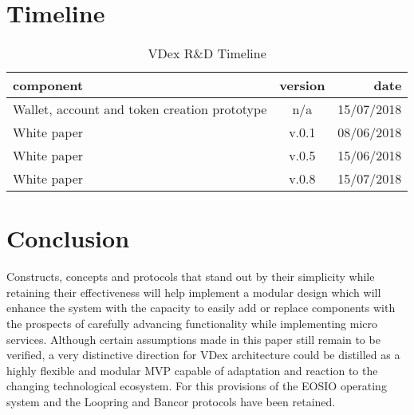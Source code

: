 \documentclass[]{article}
\begin{document}
\section{Timeline}	
\begin{table}[h!]
	\begin{center}
		\caption{VDex R\&D Timeline}
		\label{tab:table1}
		\begin{tabular}{l|c|r}
			\textbf{component} & \textbf{version}&  \textbf{date}  \\
			\hline
			Wallet, account and token creation prototype  & n/a & 15/07/2018\\
			\hline			
			White paper  & v.0.1 & 08/06/2018\\
			\hline
			White paper  & v.0.5 & 15/06/2018\\
			\hline
			White paper  & v.0.8  & 15/07/2018\\
			\hline
			
			
		\end{tabular}
	\end{center}
\end{table}
		
\section{Conclusion}
Constructs, concepts and protocols that stand out by their simplicity
while retaining their effectiveness will help implement a modular
design which will enhance the system with the capacity to easily add or replace components with the prospects of carefully advancing functionality while 
implementing micro services.
Although certain assumptions made in this paper still remain to be verified,
a very distinctive direction for VDex architecture could be distilled as a highly flexible and modular MVP capable of adaptation and reaction to the changing technological ecosystem.
For this provisions of the EOSIO operating system and the Loopring and Bancor protocols have been retained. 







\cite{1}
\cite{2}
\cite{3}
\cite{4}
\cite{5}
\cite{6}
\cite{7}
\cite{8}
\cite{9}
\cite{10}
\cite{11}
\cite{12}
\cite{13}
\cite{14}
\cite{15}
\cite{16}
\cite{17}
\cite{18}
\cite{19}

 
\end{document}
